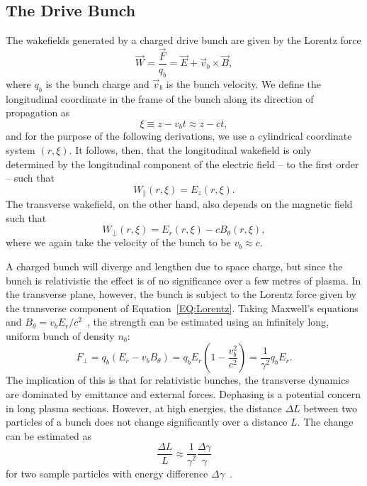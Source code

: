 \subsection{The Drive Bunch}
\label{Int:BPI:Drive}

The wakefields generated by a charged drive bunch are given by the Lorentz force
\begin{equation}
    \vec{W} = \frac{\vec{F}}{q_{b}} = \vec{E} + \vec{v}_{b} \times \vec{B}, \label{EQ:Lorentz}
\end{equation}
where $q_{b}$ is the bunch charge and $\vec{v}_{b}$ is the bunch velocity.
We define the longitudinal coordinate in the frame of the bunch along its direction of propagation as
\begin{equation}
    \xi \equiv z - v_{b}t \approx z - ct, \label{EQ:Xi}
\end{equation}
and for the purpose of the following derivations, we use a cylindrical coordinate system $(r, \xi)$.
It follows, then, that the longitudinal wakefield is only determined by the longitudinal component of the electric field -- to the first order -- such that
\begin{equation}
    W_{\parallel}(r,\xi) = E_{z}(r,\xi). \label{EQ:Wz}
\end{equation}
The transverse wakefield, on the other hand, also depends on the magnetic field such that
\begin{equation}
    W_{\perp}(r,\xi) = E_{r}(r,\xi) - cB_{\theta}(r,\xi), \label{EQ:Wr}
\end{equation}
where we again take the velocity of the bunch to be $v_{b} \approx c$.

A charged bunch will diverge and lengthen due to space charge, but since the bunch is relativistic the effect is of no significance over a few metres of plasma.
In the transverse plane, however, the bunch is subject to the Lorentz force given by the transverse component of Equation~\ref{EQ:Lorentz}.
Taking Maxwell's equations and $B_{\theta} = v_{b}E_{r}/c^{2}$~\cite{schindl:1999}, the strength can be estimated using an infinitely long, uniform bunch of density $n_{b}$:
\begin{equation}
    F_{\perp} = q_{b}(E_{r} - v_{b}B_{\theta})
              = q_{b}E_{r}\left(1 - \frac{v_{b}^{2}}{c^{2}}\right)
              = \frac{1}{\gamma^2}q_{b}E_{r}. \label{EQ:DeFocR}
\end{equation}
The implication of this is that for relativistic bunches, the transverse dynamics are dominated by emittance and external forces.
Dephasing is a potential concern in long plasma sections.
However, at high energies, the distance $\Delta L$ between two particles of a bunch does not change significantly over a distance $L$.
The change can be estimated as
\begin{equation}
    \frac{\Delta L}{L} \approx \frac{1}{\gamma^{2}}\frac{\Delta\gamma}{\gamma} \label{EQ:DePhL}
\end{equation}
for two sample particles with energy difference $\Delta\gamma$~\cite{muggli:2017}.

